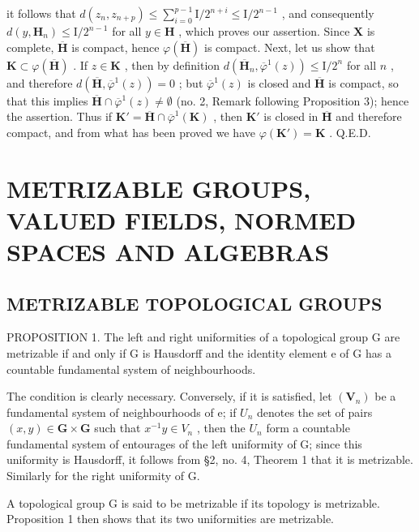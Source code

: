 it follows that \(d(z_n, z_{n+p}) \leqslant \sum_{i=0}^{p-1} \mathrm{I}/2^{n+i} \leqslant \mathrm{I}/2^{n-1}\) , and consequently \(d(y, \mathbf{H}_n) \leqslant \mathrm{I}/2^{n-1}\) for all \(y \in \mathbf{H}\) , which proves our assertion. Since \(\mathbf{X}\) is complete, \(\overline{\mathbf{H}}\) is compact, hence \(\varphi(\overline{\mathbf{H}})\) is compact. Next, let us show that \(\mathbf{K} \subset \varphi(\overline{\mathbf{H}})\) . If \(z \in \mathbf{K}\) , then by definition \(d(\overline{\mathbf{H}}_n, \overline{\varphi}^1(z)) \leqslant \mathrm{I}/2^n\) for all \(n\) , and therefore \(d(\overline{\mathbf{H}}, \overline{\varphi}^1(z)) = 0\) ; but \(\overline{\varphi}^1(z)\) is closed and \(\overline{\mathbf{H}}\) is compact, so that this implies \(\overline{\mathbf{H}} \cap \overline{\varphi}^1(z) \neq \emptyset\) (no. 2, Remark following Proposition 3); hence the assertion. Thus if \(\mathbf{K}' = \overline{\mathbf{H}} \cap \overline{\varphi}^1(\mathbf{K})\) , then \(\mathbf{K}'\) is closed in \(\overline{\mathbf{H}}\) and therefore compact, and from what has been proved we have \(\varphi(\mathbf{K}') = \mathbf{K}\) . Q.E.D.

\section{METRIZABLE GROUPS, VALUED FIELDS, NORMED SPACES AND ALGEBRAS}

\subsection{METRIZABLE TOPOLOGICAL GROUPS}

PROPOSITION 1. The left and right uniformities of a topological group G are metrizable if and only if G is Hausdorff and the identity element e of G has a countable fundamental system of neighbourhoods.

The condition is clearly necessary. Conversely, if it is satisfied, let \((\mathbf{V}_{n})\) be a fundamental system of neighbourhoods of e; if \(U_{n}\) denotes the set of pairs \((x, y) \in \mathbf{G} \times \mathbf{G}\) such that \(x^{-1}y \in V_{n}\) , then the \(U_{n}\) form a countable fundamental system of entourages of the left uniformity of G; since this uniformity is Hausdorff, it follows from §2, no. 4, Theorem 1 that it is metrizable. Similarly for the right uniformity of G.

A topological group G is said to be metrizable if its topology is metrizable. Proposition 1 then shows that its two uniformities are metrizable.

